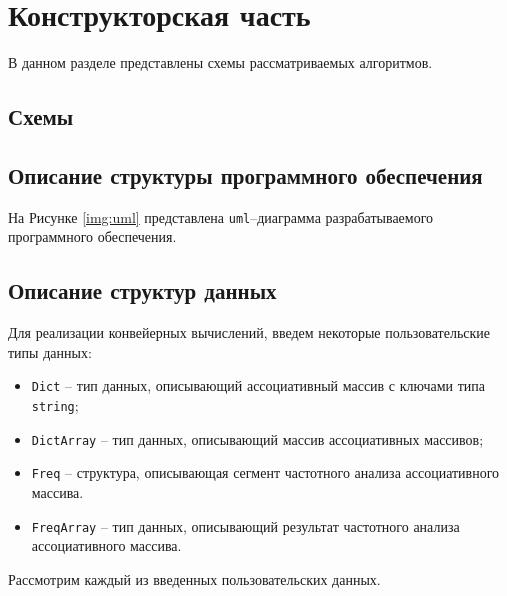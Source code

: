 \chapter{Конструкторская часть}

В данном разделе представлены схемы рассматриваемых алгоритмов.

\section{Схемы}


\clearpage

\clearpage

\section{Описание структуры программного обеспечения}

На Рисунке \ref{img:uml} представлена \texttt{uml}--диаграмма  разрабатываемого программного обеспечения.


\section{Описание структур данных}

Для реализации конвейерных вычислений, введем некоторые пользовательские типы данных:

\begin{itemize}
    \item \texttt{Dict} -- тип данных, описывающий ассоциативный массив с ключами типа \texttt{string};
    \item \texttt{DictArray} -- тип данных, описывающий массив ассоциативных массивов;
    \item \texttt{Freq} -- структура, описывающая сегмент частотного анализа ассоциативного массива.
    \item \texttt{FreqArray} -- тип данных, описывающий результат частотного анализа ассоциативного массива.
\end{itemize}

Рассмотрим каждый из введенных пользовательских данных.
\clearpage


